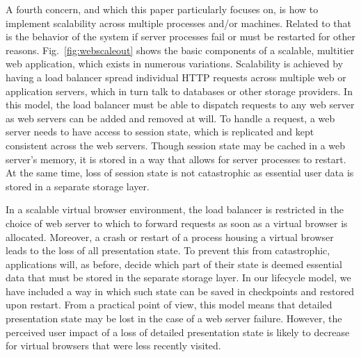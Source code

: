 A fourth concern, and which this paper particularly focuses on, is how to implement
scalability across multiple processes and/or machines. Related to that is the 
behavior of the system if server processes fail or must be restarted for other reasons.
Fig.~\ref{fig:webscaleout} shows the basic components of a scalable, multitier web 
application, which exists in numerous variations.  Scalability is achieved
by having a load balancer spread individual HTTP requests across multiple
web or application servers, which in turn talk to databases or other storage
providers.  In this model, the load balancer must be able to dispatch requests 
to any web server as web servers can be added and removed at will. To handle a 
request, a web server needs to have access to session state, which is replicated
and kept consistent across the web servers.  Though session state may be cached
in a web server's memory, it is stored in a way that allows for server processes
to restart.  At the same time, loss of session state is not catastrophic
as essential user data is stored in a separate storage layer.

In a scalable virtual browser environment, the load balancer is restricted
in the choice of web server to which to forward requests as soon as a virtual
browser is allocated.  Moreover, a crash or restart of a process housing a
virtual browser leads to the loss of all presentation state.  To prevent this
from catastrophic, applications will, as before, decide which part of their
state is deemed essential data that must be stored in the separate storage
layer.  In our lifecycle model, we have included a way in which such state
can be saved in checkpoints and restored upon restart.
From a practical point of view, this model means that detailed presentation
state may be lost in the case of a web server failure.
However, the perceived user impact of a loss of detailed presentation state 
is likely to decrease for virtual browsers that were less recently visited.

